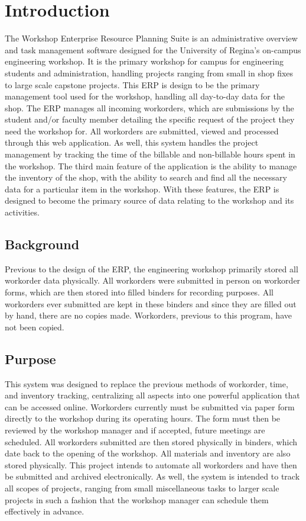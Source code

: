 \section{Introduction}
The Workshop Enterprise Resource Planning Suite is an administrative overview and task management software designed for the University of Regina's on-campus engineering workshop. It is the primary workshop for campus for engineering students and administration, handling projects ranging from small in shop fixes to large scale capstone projects. This ERP is design to be the primary management tool used for the workshop, handling all day-to-day data for the shop. The ERP manages all incoming workorders, which are submissions by the student and/or faculty member detailing the specific request of the project they need the workshop for. All workorders are submitted, viewed and processed through this web application. As well, this system handles the project management by tracking the time of the billable and non-billable hours spent in the workshop. The third main feature of the application is the ability to manage the inventory of the shop, with the ability to search and find all the necessary data for a particular item in the workshop. With these features, the ERP is designed to become the primary source of data relating to the workshop and its activities. 

\subsection{Background}
Previous to the design of the ERP, the engineering workshop primarily stored all workorder data physically. All workorders were submitted in person on workorder forms, which are then stored into filled binders for recording purposes. All workorders ever submitted are kept in these binders and since they are filled out by hand, there are no copies made. Workorders, previous to this program, have not been copied.

\subsection{Purpose}
This system was designed to replace the previous methods of workorder, time, and inventory tracking, centralizing all aspects into one powerful application that can be accessed online. Workorders currently must be submitted via paper form directly to the workshop during its operating hours. The form must then be reviewed by the workshop manager and if accepted, future meetings are scheduled. All workorders submitted are then stored physically in binders, which date back to the opening of the workshop. All materials and inventory are also stored physically. This project intends to automate all workorders and have then be submitted and archived electronically. As well, the system is intended to track all scopes of projects, ranging from small miscellaneous tasks to larger scale projects in such a fashion that the workshop manager can schedule them effectively in advance. 
